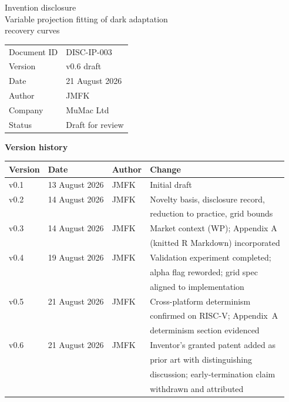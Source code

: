 \documentclass[11pt,a4paper]{article}
\newcommand{\docid}{DISC-IP-003}
\newcommand{\docversion}{v0.6 draft}
\newcommand{\docdate}{21 August 2026}
\begin{document}
\begin{center}
{\LARGE Invention disclosure}\\[2mm]
{\Large Variable projection fitting of dark adaptation\\
recovery curves}\\[6mm]
\begin{tabular}{ll}
\toprule
Document ID & \docid \\
Version & \docversion \\
Date & \docdate \\
Author & JMFK \\
Company & MuMac Ltd \\
Status & Draft for review \\
\bottomrule
\end{tabular}
\end{center}

\vspace{4mm}
\noindent\textbf{Version history}

\noindent\begin{tabular}{llll}
\toprule
Version & Date & Author & Change \\
\midrule
v0.1 & 13 August 2026 & JMFK & Initial draft \\
v0.2 & 14 August 2026 & JMFK & Novelty basis, disclosure record,\\
     &                &      & reduction to practice, grid bounds \\
v0.3 & 14 August 2026 & JMFK & Market context (WP); Appendix A\\
     &                &      & (knitted R Markdown) incorporated \\
v0.4 & 19 August 2026 & JMFK & Validation experiment completed;\\
     &                &      & alpha flag reworded; grid spec\\
     &                &      & aligned to implementation \\
v0.5 & 21 August 2026 & JMFK & Cross-platform determinism\\
     &                &      & confirmed on RISC-V; Appendix~A\\
     &                &      & determinism section evidenced \\
v0.6 & 21 August 2026 & JMFK & Inventor's granted patent added as\\
     &                &      & prior art with distinguishing\\
     &                &      & discussion; early-termination claim\\
     &                &      & withdrawn and attributed \\
\bottomrule
\end{tabular}
\end{document}
